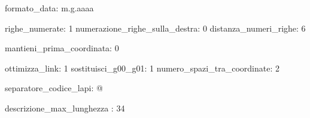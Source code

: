 formato_data: m.g.aaaa

righe_numerate:                 1
numerazione_righe_sulla_destra: 0
distanza_numeri_righe:          6

mantieni_prima_coordinata:      0

ottimizza_link:              1
sostituisci_g00_g01:         1
numero_spazi_tra_coordinate: 2

separatore_codice_lapi: @

descrizione_max_lunghezza : 34